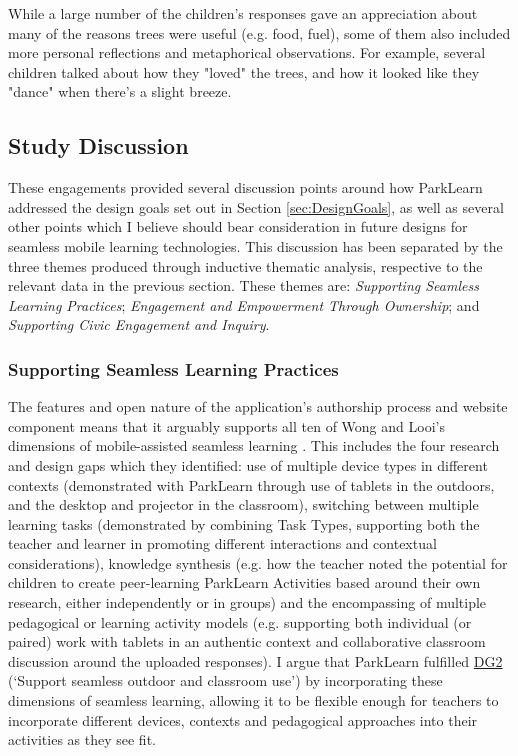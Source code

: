 While a large number of the children's responses gave an appreciation about many of the reasons trees were useful (e.g. food, fuel), some of them also included more personal reflections and metaphorical observations. For example, several children talked about how they "loved" the trees, and how it looked like they "dance" when there's a slight breeze.

\subsection{Study Discussion}
\label{sec:TeacherDiscussion}
These engagements provided several discussion points around how ParkLearn addressed the design goals set out in Section \ref{sec:DesignGoals}, as well as several other points which I believe should bear consideration in future designs for seamless mobile learning technologies. This discussion has been separated by the three themes produced through inductive thematic analysis, respective to the relevant data in the previous section. These themes are: \textit{Supporting Seamless Learning Practices}; \textit{Engagement and Empowerment Through Ownership}; and \textit{Supporting Civic Engagement and Inquiry}.

\subsubsection{Supporting Seamless Learning Practices}

The features and open nature of the application's authorship process and website component means that it arguably supports all ten of Wong and Looi’s dimensions of mobile-assisted seamless learning \citep{Wong2011}.  This includes the four research and design gaps which they identified: use of multiple device types in different contexts (demonstrated with ParkLearn through use of tablets in the outdoors, and the desktop and projector in the classroom), switching between multiple learning tasks (demonstrated by combining Task Types, supporting both the teacher and learner in promoting different interactions and contextual considerations), knowledge synthesis (e.g. how the teacher noted the potential for children to create peer-learning ParkLearn Activities based around their own research, either independently or in groups) and the encompassing of multiple pedagogical or learning activity models (e.g. supporting both individual (or paired) work with tablets in an authentic context and collaborative classroom discussion around the uploaded responses). I argue that ParkLearn fulfilled \hyperref[DG2]{DG2} (`Support seamless outdoor and classroom use') by incorporating these dimensions of seamless learning, allowing it to be flexible enough for teachers to incorporate different devices, contexts and pedagogical approaches into their activities as they see fit.
  
